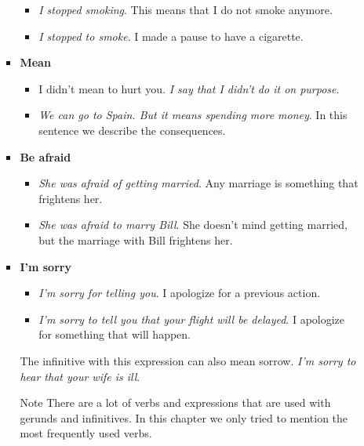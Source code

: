 \begin{itemize}
\begin{itemize}
\begin{itemize}
\begin{itemize}

\item \textit{I stopped smoking}. This means that I do not smoke anymore.
\item \textit{I stopped to smoke}. I made a pause to have a cigarette.
\end{itemize}

\item \textbf{Mean}

\begin{itemize}
\item I didn't mean to hurt you. \textit{I say that I didn't do it on purpose}.
\item \textit{We can go to Spain. But it means spending more money}. In this sentence we describe the consequences.
\end{itemize}

\item \textbf{Be afraid}

\begin{itemize}
\item \textit{She was afraid of getting married}. Any marriage is something that frightens her.
\item \textit{She was afraid to marry Bill}.  She doesn't mind getting married, but the marriage with Bill frightens her.
\end{itemize}

\item \textbf{I'm sorry}

\begin{itemize}

\item \textit{I'm sorry for telling you}. I apologize for a previous action.
\item \textit{I'm sorry to tell you that your flight will be delayed}. I apologize for something that will happen.
\end{itemize}

The infinitive with this expression can also mean sorrow. \textit{I'm sorry to hear that your wife is ill}.

Note There are a lot of verbs and expressions that are used with gerunds and infinitives. In this chapter we only tried to mention the most frequently used verbs.

\end{itemize}

\end{itemize}

\end{itemize}


